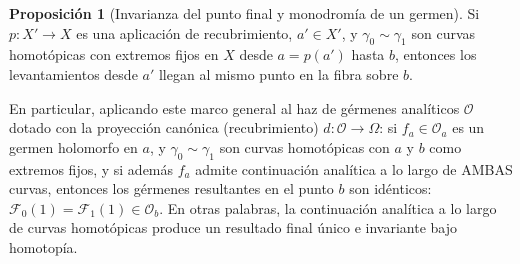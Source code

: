 \documentclass[11pt,a4paper]{article}
\theoremstyle{definition}
\newtheorem{proposicion}{Proposición}[section]
\theoremstyle{remark}
\numberwithin{equation}{section}
\begin{document}
\begin{proposicion}[Invarianza del punto final y monodromía de un germen]
Si $p : X' \to X$ es una aplicación de recubrimiento, $a' \in X'$, y $\gamma_0 \sim \gamma_1$ son curvas homotópicas con extremos fijos en $X$ desde $a = p(a')$ hasta $b$, entonces los levantamientos desde $a'$ llegan al mismo punto en la fibra sobre $b$. 

En particular, aplicando este marco general al haz de gérmenes analíticos $\mathcal{O}$ dotado con la proyección canónica (recubrimiento) $d : \mathcal{O} \to \Omega$: si $f_a \in \mathcal{O}_a$ es un germen holomorfo en $a$, y $\gamma_0 \sim \gamma_1$ son curvas homotópicas con $a$ y $b$ como extremos fijos, y si además $f_a$ admite continuación analítica a lo largo de AMBAS curvas, entonces los gérmenes resultantes en el punto $b$ son idénticos: $\mathcal{F}_0(1) = \mathcal{F}_1(1) \in \mathcal{O}_b$. En otras palabras, la continuación analítica a lo largo de curvas homotópicas produce un resultado final único e invariante bajo homotopía.
\end{proposicion}
\end{document}
